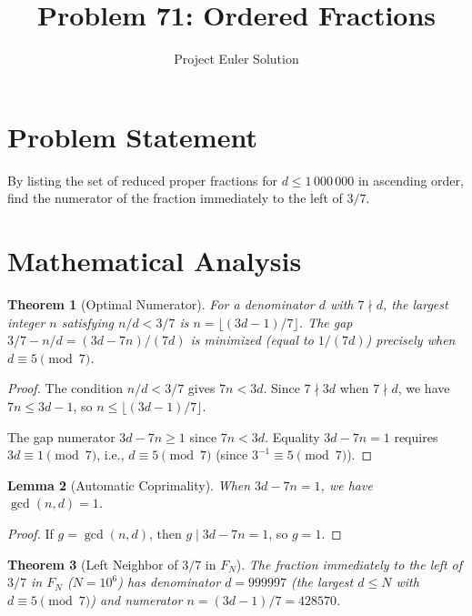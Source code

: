 \documentclass[12pt,a4paper]{article}
\title{Problem 71: Ordered Fractions}
\author{Project Euler Solution}
\date{}
\newtheorem{theorem}{Theorem}
\newtheorem{lemma}[theorem]{Lemma}
\begin{document}
\maketitle

\section{Problem Statement}

By listing the set of reduced proper fractions for $d \le 1\,000\,000$ in ascending order, find the numerator of the fraction immediately to the left of $3/7$.

\section{Mathematical Analysis}

\begin{theorem}[Optimal Numerator]
For a denominator $d$ with $7 \nmid d$, the largest integer $n$ satisfying $n/d < 3/7$ is $n = \lfloor (3d - 1)/7 \rfloor$. The gap $3/7 - n/d = (3d - 7n)/(7d)$ is minimized (equal to $1/(7d)$) precisely when $d \equiv 5 \pmod{7}$.
\end{theorem}

\begin{proof}
The condition $n/d < 3/7$ gives $7n < 3d$. Since $7 \nmid 3d$ when $7 \nmid d$, we have $7n \leq 3d - 1$, so $n \leq \lfloor (3d-1)/7 \rfloor$.

The gap numerator $3d - 7n \geq 1$ since $7n < 3d$. Equality $3d - 7n = 1$ requires $3d \equiv 1 \pmod{7}$, i.e., $d \equiv 5 \pmod{7}$ (since $3^{-1} \equiv 5 \pmod{7}$).
\end{proof}

\begin{lemma}[Automatic Coprimality]
When $3d - 7n = 1$, we have $\gcd(n, d) = 1$.
\end{lemma}

\begin{proof}
If $g = \gcd(n, d)$, then $g \mid 3d - 7n = 1$, so $g = 1$.
\end{proof}

\begin{theorem}[Left Neighbor of $3/7$ in $F_N$]
The fraction immediately to the left of $3/7$ in $F_N$ ($N = 10^6$) has denominator $d = 999997$ (the largest $d \leq N$ with $d \equiv 5 \pmod{7}$) and numerator $n = (3d - 1)/7 = 428570$.
\end{theorem}
\end{document}
